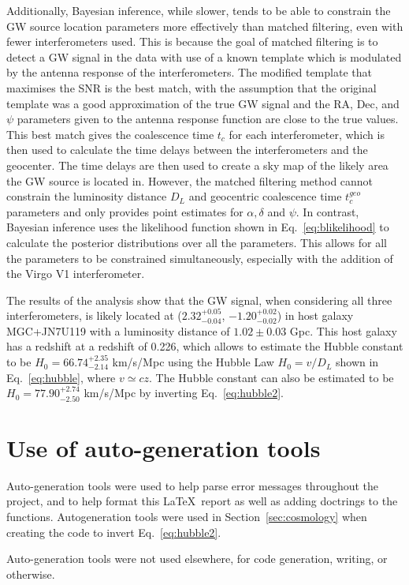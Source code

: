 \documentclass[11pt,a4paper]{article}
\begin{document}
Additionally, Bayesian inference, while slower, tends to be able to constrain the GW source location parameters more effectively than matched filtering, even with fewer interferometers used. This is because the goal of matched filtering is to detect a GW signal in the data with use of a known template which is modulated by the antenna response of the interferometers. The modified template that maximises the SNR is the best match, with the assumption that the original template was a good approximation of the true GW signal and the RA, Dec, and $\psi$ parameters given to the antenna response function are close to the true values. This best match gives the coalescence time $t_c$ for each interferometer, which is then used to calculate the time delays between the interferometers and the geocenter. The time delays are then used to create a sky map of the likely area the GW source is located in. However, the matched filtering method cannot constrain the luminosity distance $D_L$ and geocentric coalescence time $t_c^{geo}$ parameters and only provides point estimates for $\alpha, \delta$ and $\psi$. In contrast, Bayesian inference uses the likelihood function shown in Eq.~\ref{eq:blikelihood} to calculate the posterior distributions over all the parameters. This allows for all the parameters to be constrained simultaneously, especially with the addition of the Virgo V1 interferometer.

The results of the analysis show that the GW signal, when considering all three interferometers, is likely located at ($2.32^{+0.05}_{-0.04}$, $-1.20^{+0.02}_{-0.02}$) in host galaxy MGC+JN7U119 with a luminosity distance of $1.02 \pm 0.03$ Gpc. This host galaxy has a redshift at a redshift of 0.226, which allows to estimate the Hubble constant to be $H_0=66.74^{+2.35}_{-2.14}$ km/s/Mpc using the Hubble Law $H_0=v/D_L$ shown in Eq.~\ref{eq:hubble}, where $v\simeq cz$. The Hubble constant can also be estimated to be $H_0=77.90^{+2.74}_{-2.50}$ km/s/Mpc by inverting Eq.~\ref{eq:hubble2}.

\clearpage


\appendix
\section{Use of auto-generation tools}
Auto-generation tools were used to help parse error messages throughout the project, and to help format this \LaTeX\ report as well as adding doctrings to the functions. Autogeneration tools were used in Section~\ref{sec:cosmology} when creating the code to invert Eq.~\ref{eq:hubble2}.

Auto-generation tools were not used elsewhere, for code generation, writing, or otherwise.
\end{document}
